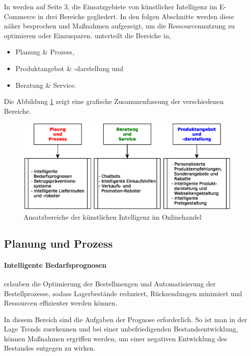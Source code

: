 In \cite{glaess2018kuenstliche} werden auf Seite 3, die Einsatzgebiete von künstlicher Intelligenz im E-Commerce in drei Bereiche gegliedert. In den folgen Abschnitte werden diese näher besprochen und Maßnahmen aufgezeigt, um die Ressourcennutzung zu optimieren oder Einzusparen. \cite{glaess2018kuenstliche} unterteilt die Bereiche in,

\begin{itemize}
	\item Planung \& Prozess,
	\item Produktangebot \& -darstellung und
	\item Beratung \& Service.
\end{itemize}

Die Abbildung \ref{img:areas_of_application_for_ai_in_e__commerce} zeigt eine grafische Zusammenfassung der verschiedenen Bereiche.

\begin{figure}[!ht]
	\centering
	\includegraphics[width=\linewidth]{images/ki-bereiche_glaess.eps}
	\caption{Ansatzbereiche der künstlichen Intelligenz im Onlinehandel}
	\label{img:areas_of_application_for_ai_in_e__commerce}
\end{figure}

\subsection{Planung und Prozess}
\paragraph{Intelligente Bedarfsprognosen} erlauben die Optimierung der Bestellmengen und Automatisierung der Bestellprozesse, sodass Lagerbestände reduziert, Rücksendungen minimiert und Ressourcen effizienter werden können.\vspace{0.2cm}

In diesem Bereich sind die Aufgaben der Prognose erforderlich. So ist man in der Lage Trends zuerkennen und bei einer unbefriedigenden Bestandsentwicklung, können Maßnahmen ergriffen werden, um einer negativen Entwicklung des Bestandes entgegen zu wirken.\vspace{0.2cm}

